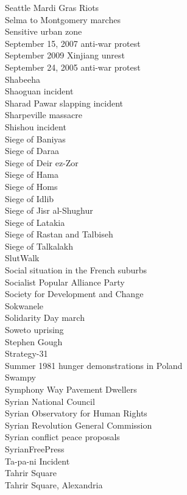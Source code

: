 Seattle Mardi Gras Riots\\
Selma to Montgomery marches\\
Sensitive urban zone\\
September 15, 2007 anti-war protest\\
September 2009 Xinjiang unrest\\
September 24, 2005 anti-war protest\\
Shabeeha\\
Shaoguan incident\\
Sharad Pawar slapping incident\\
Sharpeville massacre\\
Shishou incident\\
Siege of Baniyas\\
Siege of Daraa\\
Siege of Deir ez-Zor\\
Siege of Hama\\
Siege of Homs\\
Siege of Idlib\\
Siege of Jisr al-Shughur\\
Siege of Latakia\\
Siege of Rastan and Talbiseh\\
Siege of Talkalakh\\
SlutWalk\\
Social situation in the French suburbs\\
Socialist Popular Alliance Party\\
Society for Development and Change\\
Sokwanele\\
Solidarity Day march\\
Soweto uprising\\
Stephen Gough\\
Strategy-31\\
Summer 1981 hunger demonstrations in Poland\\
Swampy\\
Symphony Way Pavement Dwellers\\
Syrian National Council\\
Syrian Observatory for Human Rights\\
Syrian Revolution General Commission\\
Syrian conflict peace proposals\\
SyrianFreePress\\
Ta-pa-ni Incident\\
Tahrir Square\\
Tahrir Square, Alexandria\\
